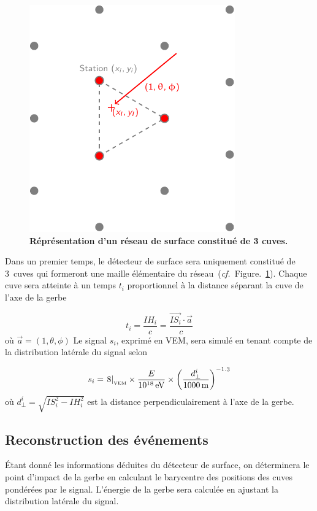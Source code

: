 \documentclass[10pt,a4paper,twoside]{report}
\newcommand{\fig}[1]{Figure.~\ref{#1}}
\begin{document}
\begin{figure}
  \centering
  \includegraphics[scale=1.]{./plot/sd}
  \caption{\textbf{\label{fig::sd}Réprésentation d'un réseau de
      surface constitué de 3 cuves.}}
\end{figure}

Dans un premier temps, le détecteur de surface sera uniquement
constitué de 3~cuves qui formeront une maille élémentaire du
réseau~(\emph{cf.}~\fig{fig::sd}). Chaque cuve sera atteinte à un
temps $t_i$ proportionnel à la distance séparant la cuve de l'axe de la
gerbe

\begin{equation*}
  t_i = \frac{IH_i}{c} = \frac{\vec{IS_i}\cdot\vec{a}}{c}
\end{equation*}
où $\vec{a}=(1,\theta, \phi)$
Le signal $s_i$, exprimé en VEM, sera simulé en tenant compte de la
distribution latérale du signal selon

\begin{equation*}
  s_i = \left.8\right|_\text{\tiny VEM}\times\frac{E}{\unit[10^{18}]{eV}}\times\left(\frac{d_\perp^i}{\unit[1000]{m}}\right)^{-1.3}
\end{equation*}
où $d_\perp^i = \sqrt{IS_i^2 - IH_i^2}$ est la distance perpendiculairement à
l'axe de la gerbe.

\subsection{Reconstruction des événements}

\'Etant donné les informations déduites du détecteur de surface, on
déterminera le point d'impact de la gerbe en calculant le barycentre
des positions des cuves pondérées par le signal. L'énergie de la gerbe
sera calculée en ajustant la distribution latérale du signal.
\end{document}
